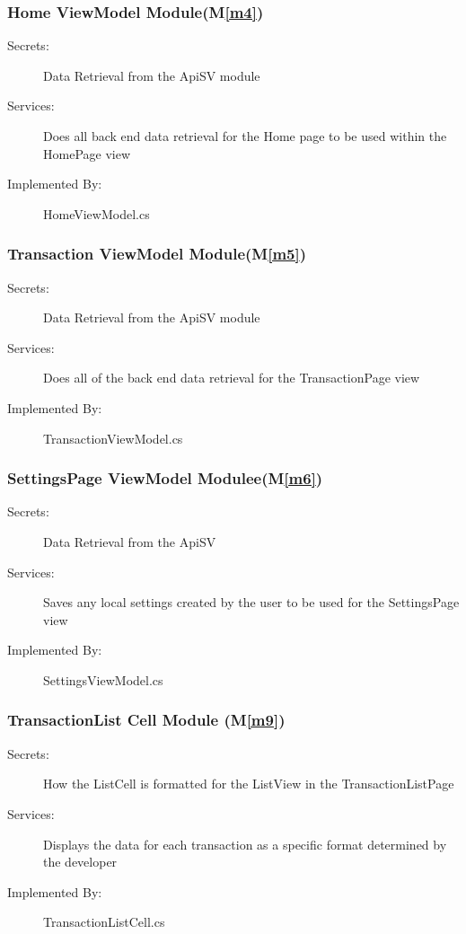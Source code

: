 \documentclass[12pt, titlepage]{article}
\newcommand{\mref}[1]{M\ref{#1}}
\begin{document}
\subsubsection{Home ViewModel Module(\mref{m4})}
\begin{description}
\item[Secrets:] Data Retrieval from the ApiSV module
\item[Services:] Does all back end data retrieval for the Home page to be used within the HomePage view
\item[Implemented By:] HomeViewModel.cs
\end{description}

\subsubsection{Transaction ViewModel Module(\mref{m5})}
\begin{description}
\item[Secrets:] Data Retrieval from the ApiSV module
\item[Services:] Does all of the back end data retrieval for the TransactionPage view
\item[Implemented By:] TransactionViewModel.cs
\end{description}

\subsubsection{SettingsPage ViewModel Modulee(\mref{m6})}
\begin{description}
\item[Secrets:] Data Retrieval from the ApiSV
\item[Services:] Saves any local settings created by the user to be used for the SettingsPage view
\item[Implemented By:] SettingsViewModel.cs
\end{description}

\subsubsection{TransactionList Cell Module (\mref{m9})}
\begin{description}
\item[Secrets:] How the ListCell is formatted for the ListView in the TransactionListPage
\item[Services:] Displays the data for each transaction as a specific format determined by the developer
\item[Implemented By:] TransactionListCell.cs
\end{description}
\end{document}
